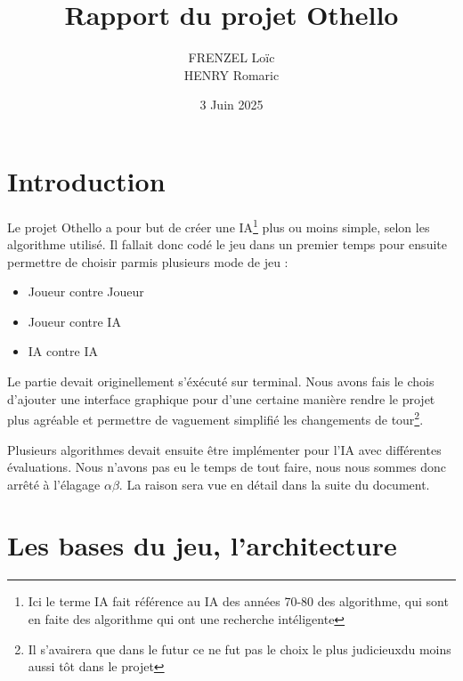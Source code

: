 \documentclass[12pt, legalpaper]{article}
\title{Rapport du projet Othello}
\author{FRENZEL Loïc\\HENRY Romaric}
\date{3 Juin 2025}
\begin{document}
\maketitle

\newpage

\tableofcontents

\newpage

\section{Introduction}

Le projet Othello a pour but de créer une IA\footnote{Ici le terme IA fait référence au IA 
des années 70-80 des algorithme, qui sont en faite des algorithme qui ont une recherche intéligente}
plus ou moins simple, selon les algorithme utilisé. Il fallait donc codé le jeu dans un premier temps
pour ensuite permettre de choisir parmis plusieurs mode de jeu :   
\begin{itemize}
    \item Joueur contre Joueur
    \item Joueur contre IA
    \item IA contre IA
\end{itemize}


Le partie devait originellement s'éxécuté sur terminal. Nous avons fais le chois d'ajouter une interface
graphique pour d'une certaine manière rendre le projet plus agréable et permettre de vaguement simplifié 
les changements de 
tour\footnote{Il s'avairera que dans le futur ce ne fut pas le choix le plus judicieuxdu moins aussi tôt dans le projet}.

Plusieurs algorithmes devait ensuite être implémenter pour l'IA avec différentes évaluations. 
Nous n'avons pas eu le temps de tout faire, nous nous sommes donc arrêté à l'élagage $\alpha$$\beta$.
 La raison sera vue en détail dans la suite du document.

\newpage

\section{Les bases du jeu, l'architecture}
\end{document}
